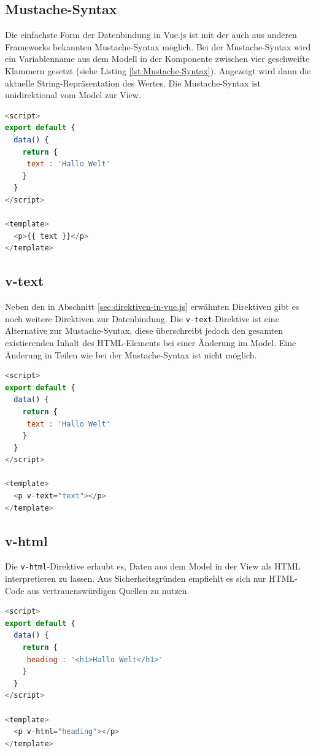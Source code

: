 \subsection*{Mustache-Syntax}
Die einfachste Form der Datenbindung in Vue.js ist mit der auch aus anderen Frameworks bekannten Mustache-Syntax möglich.
Bei der Mustache-Syntax wird ein Variablenname aus dem Modell in der Komponente zwischen vier geschweifte Klammern gesetzt (siehe Listing \ref{lst:Mustache-Syntax}).
Angezeigt wird dann die aktuelle String-Repräsentation des Wertes.
Die Mustache-Syntax ist unidirektional vom Model zur View. \cite{vueTemplateSyntax}
\begin{lstlisting}[caption={Mustache-Syntax},language=javascript, label={lst:Mustache-Syntax}]
<script>
export default {
  data() {
    return {
     text : 'Hallo Welt'
    }
  }
</script>

<template>
  <p>{{ text }}</p>
</template>
\end{lstlisting}

\subsection*{v-text}
Neben den in Abschnitt \ref{sec:direktiven-in-vue.js}
erwähnten Direktiven gibt es noch weitere Direktiven zur Datenbindung.
Die \texttt{v-text}-Direktive ist eine Alternative zur Mustache-Syntax,
diese überschreibt jedoch den gesamten existierenden Inhalt des HTML-Elements bei einer Änderung im Model.
Eine Änderung in Teilen wie bei der Mustache-Syntax ist nicht möglich. \cite{vueDirectives}
\begin{lstlisting}[caption={\texttt{v-text}-Direktive},language=javascript, label={lst:v-text-Direktive}]
<script>
export default {
  data() {
    return {
     text : 'Hallo Welt'
    }
  }
</script>

<template>
  <p v-text="text"></p>
</template>
\end{lstlisting}

\subsection*{v-html}
Die \texttt{v-html}-Direktive erlaubt es, Daten aus dem Model in der View als HTML interpretieren zu lassen.
Aus Sicherheitsgründen empfiehlt es sich nur HTML-Code aus vertrauenswürdigen Quellen zu nutzen. \cite{vueTemplateSyntax}
\begin{lstlisting}[caption={\texttt{v-html}-Direktive},language=javascript, label={lst:v-html-Direktive}]
<script>
export default {
  data() {
    return {
     heading : '<h1>Hallo Welt</h1>'
    }
  }
</script>

<template>
  <p v-html="heading"></p>
</template>
\end{lstlisting}

